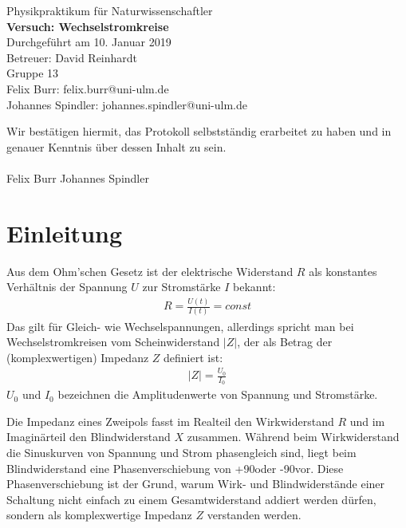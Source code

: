 \documentclass{scrartcl}
\begin{document}
\begin{titlepage}
  \begin{center}
    \vspace*{1cm}
    \LARGE
    Physikpraktikum für Naturwissenschaftler \\
    \vspace*{1cm}
    \Huge
    \textbf{Versuch: Wechselstromkreise} \\
    \vspace*{0.3cm}
    \Large
    Durchgeführt am 10. Januar 2019 \\
    Betreuer: David Reinhardt \\
    \vspace*{2.5cm}
    Gruppe 13 \\
    Felix Burr: felix.burr@uni-ulm.de \\
    Johannes Spindler: johannes.spindler@uni-ulm.de \\
    \vfill 
  \end{center}
  Wir bestätigen hiermit, das Protokoll selbstständig erarbeitet zu haben und in genauer Kenntnis über dessen Inhalt zu sein. \\
  \vspace*{0.8cm}
  \\
  Felix Burr
  \hfill
  Johannes Spindler
\end{titlepage}
\pagebreak
\tableofcontents


\pagebreak

\section{Einleitung}
Aus dem Ohm'schen Gesetz ist der elektrische Widerstand $R$ als konstantes Verhältnis der Spannung $U$ zur Stromstärke $I$ bekannt:
\begin{align}
R = \frac{U(t)}{I(t)} = const
\end{align}
Das gilt für Gleich- wie Wechselspannungen, allerdings spricht man bei Wechselstromkreisen vom Scheinwiderstand $|Z|$, der als Betrag der (komplexwertigen) Impedanz $Z$ definiert ist:
\begin{align}
|Z| = \frac{U_{0}}{I_{0}}
\end{align}
$U_{0}$ und $I_{0}$ bezeichnen die Amplitudenwerte von Spannung und Stromstärke.

Die Impedanz eines Zweipols fasst im Realteil den Wirkwiderstand $R$ und im Imaginärteil den Blindwiderstand $X$ zusammen. Während beim Wirkwiderstand die Sinuskurven von Spannung und Strom phasengleich sind, liegt beim Blindwiderstand eine Phasenverschiebung von +90\degree oder -90\degree vor. Diese Phasenverschiebung ist der Grund, warum Wirk- und Blindwiderstände einer Schaltung nicht einfach zu einem Gesamtwiderstand addiert werden dürfen, sondern als komplexwertige Impedanz $Z$ verstanden werden. 
\end{document}
